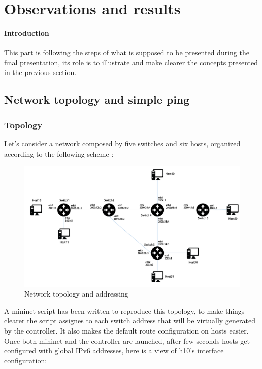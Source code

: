 \documentclass{article}
\begin{document}
\section{Observations and results} 

\paragraph{Introduction}
This part is following the steps of what is supposed to be presented
during the final presentation, its role is to illustrate and make
clearer the concepts presented in the previous section.

\subsection{Network topology and simple ping}

\subsubsection{Topology}
Let's consider a network composed by five switches and six hosts,
organized according to the following scheme : 

\begin{figure}[h!]
  \centering
    \includegraphics[scale=0.3]{reportPictures/networkmap.pdf}
  \caption{Network topology and addressing}
\end{figure}

\newpage

A mininet script has been written to reproduce this topology, to make
things clearer the script assignes to each switch address that will be
virtually generated by the controller. It also makes the default route
configuration on hosts easier.\\
\newline
Once both mininet and the controller are launched, after few seconds
hosts get configured with global IPv6 addresses, here is a view of
h10's interface configuration:
\end{document}
